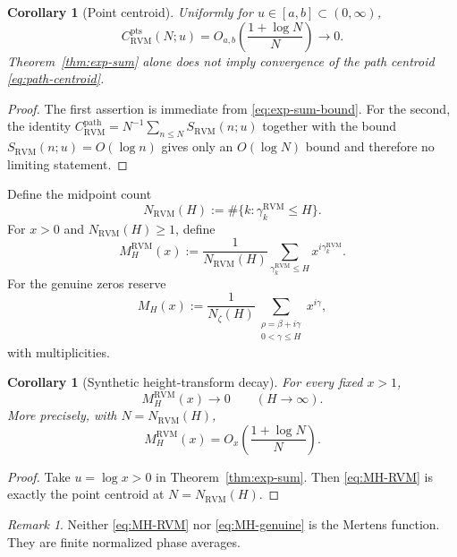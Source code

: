 \documentclass[11pt,reqno]{amsart}
\newtheorem{corollary}[theorem]{Corollary}
\theoremstyle{definition}
\theoremstyle{remark}
\newtheorem{remark}[theorem]{Remark}
\newcommand{\RVM}{\mathrm{RVM}}
\newcommand{\pts}{\mathrm{pts}}
\newcommand{\pathc}{\mathrm{path}}
\begin{document}
\begin{corollary}[Point centroid]\label{cor:point-centroid}
Uniformly for $u\in[a,b]\subset(0,\infty)$,
\begin{equation}
 C_{\RVM}^{\pts}(N;u)=O_{a,b}\!\left(\frac{1+\log N}{N}\right)\longrightarrow0.
\end{equation}
Theorem~\ref{thm:exp-sum} alone does not imply convergence of the path centroid \eqref{eq:path-centroid}.
\end{corollary}

\begin{proof}
The first assertion is immediate from \eqref{eq:exp-sum-bound}.  For the second, the identity
$C_{\RVM}^{\pathc}=N^{-1}\sum_{n\le N}S_{\RVM}(n;u)$ together with the bound $S_{\RVM}(n;u)=O(\log n)$ gives only an $O(\log N)$ bound and therefore no limiting statement.
\end{proof}

Define the midpoint count
\begin{equation}\label{eq:NRVM-count}
 N_{\RVM}(H):=\#\{k:\gamma_k^{\RVM}\le H\}.
\end{equation}
For $x>0$ and $N_{\RVM}(H)\ge1$, define
\begin{equation}\label{eq:MH-RVM}
 M_H^{\RVM}(x)
 :=\frac1{N_{\RVM}(H)}\sum_{\gamma_k^{\RVM}\le H}x^{i\gamma_k^{\RVM}}.
\end{equation}
For the genuine zeros reserve
\begin{equation}\label{eq:MH-genuine}
 M_H(x)
 :=\frac1{N_\zeta(H)}
 \sum_{\substack{\rho=\beta+i\gamma\\0<\gamma\le H}}x^{i\gamma},
\end{equation}
with multiplicities.

\begin{corollary}[Synthetic height-transform decay]\label{cor:MH-decay}
For every fixed $x>1$,
\begin{equation}
 M_H^{\RVM}(x)\longrightarrow0
 \qquad(H\to\infty).
\end{equation}
More precisely, with $N=N_{\RVM}(H)$,
\[
 M_H^{\RVM}(x)=O_x\!\left(\frac{1+\log N}{N}\right).
\]
\end{corollary}

\begin{proof}
Take $u=\log x>0$ in Theorem~\ref{thm:exp-sum}.  Then \eqref{eq:MH-RVM} is exactly the point centroid at $N=N_{\RVM}(H)$.
\end{proof}

\begin{remark}
Neither \eqref{eq:MH-RVM} nor \eqref{eq:MH-genuine} is the Mertens function.  They are finite normalized phase averages.
\end{remark}
\end{document}
